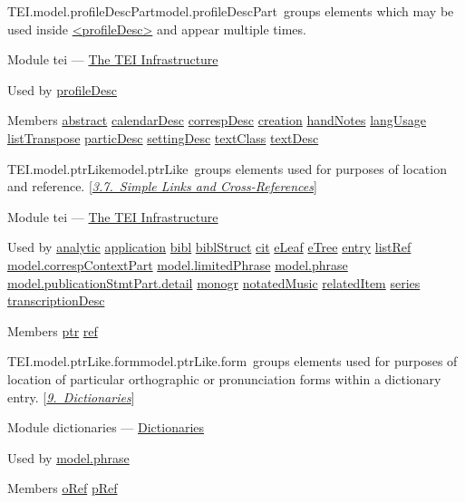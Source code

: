 \begin{reflist}
\item[]\begin{specHead}{TEI.model.profileDescPart}{model.profileDescPart} groups elements which may be used inside \hyperref[TEI.profileDesc]{<profileDesc>} and appear multiple times.\end{specHead} 
    \item[{Module}]
  tei — \hyperref[ST]{The TEI Infrastructure}
    \item[{Used by}]
  \hyperref[TEI.profileDesc]{profileDesc}
    \item[{Members}]
  \hyperref[TEI.abstract]{abstract} \hyperref[TEI.calendarDesc]{calendarDesc} \hyperref[TEI.correspDesc]{correspDesc} \hyperref[TEI.creation]{creation} \hyperref[TEI.handNotes]{handNotes} \hyperref[TEI.langUsage]{langUsage} \hyperref[TEI.listTranspose]{listTranspose} \hyperref[TEI.particDesc]{particDesc} \hyperref[TEI.settingDesc]{settingDesc} \hyperref[TEI.textClass]{textClass} \hyperref[TEI.textDesc]{textDesc}
\end{reflist}  
\begin{reflist}
\item[]\begin{specHead}{TEI.model.ptrLike}{model.ptrLike} groups elements used for purposes of location and reference. [\textit{\hyperref[COXR]{3.7.\ Simple Links and Cross-References}}]\end{specHead} 
    \item[{Module}]
  tei — \hyperref[ST]{The TEI Infrastructure}
    \item[{Used by}]
  \hyperref[TEI.analytic]{analytic} \hyperref[TEI.application]{application} \hyperref[TEI.bibl]{bibl} \hyperref[TEI.biblStruct]{biblStruct} \hyperref[TEI.cit]{cit} \hyperref[TEI.eLeaf]{eLeaf} \hyperref[TEI.eTree]{eTree} \hyperref[TEI.entry]{entry} \hyperref[TEI.listRef]{listRef} \hyperref[TEI.model.correspContextPart]{model.correspContextPart} \hyperref[TEI.model.limitedPhrase]{model.limitedPhrase} \hyperref[TEI.model.phrase]{model.phrase} \hyperref[TEI.model.publicationStmtPart.detail]{model.publicationStmtPart.detail} \hyperref[TEI.monogr]{monogr} \hyperref[TEI.notatedMusic]{notatedMusic} \hyperref[TEI.relatedItem]{relatedItem} \hyperref[TEI.series]{series} \hyperref[TEI.transcriptionDesc]{transcriptionDesc}
    \item[{Members}]
  \hyperref[TEI.ptr]{ptr} \hyperref[TEI.ref]{ref}
\end{reflist}  
\begin{reflist}
\item[]\begin{specHead}{TEI.model.ptrLike.form}{model.ptrLike.form} groups elements used for purposes of location of particular orthographic or pronunciation forms within a dictionary entry. [\textit{\hyperref[DI]{9.\ Dictionaries}}]\end{specHead} 
    \item[{Module}]
  dictionaries — \hyperref[DI]{Dictionaries}
    \item[{Used by}]
  \hyperref[TEI.model.phrase]{model.phrase}
    \item[{Members}]
  \hyperref[TEI.oRef]{oRef} \hyperref[TEI.pRef]{pRef}
\end{reflist}  
